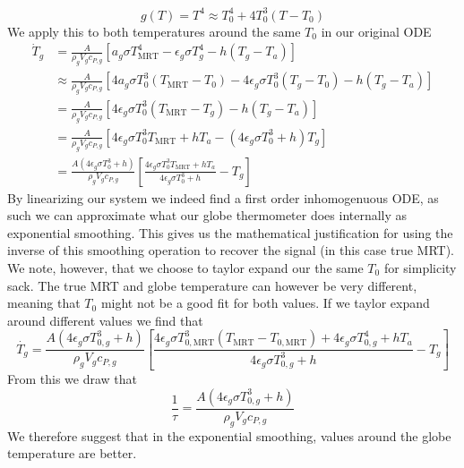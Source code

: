 \documentclass[]{scrartcl}
\begin{document}
$$
g(T) = T^4 \approx T_0^4 + 4T_0^3(T-T_0)
$$
We apply this to both temperatures around the same $T_0$ in our original ODE
\begin{equation}
\begin{split}
	\dot{T}_g &= \frac{A}{\rho_gV_gc_{P,g}}\left[a_g\sigma T^4_{\text{MRT}} - \epsilon_g\sigma T^4_g - h\left(T_g - T_a\right)\right]
	\\
	&\approx\frac{A}{\rho_gV_gc_{P,g}}\left[4a_g\sigma T_0^3(T_{\text{MRT}} - T_0) - 4\epsilon_g\sigma T_0^3(T_g - T_0) - h\left(T_g - T_a\right)\right]
	\\
	&=\frac{A}{\rho_gV_gc_{P,g}}\left[4\epsilon_g\sigma T_0^3(T_{\text{MRT}} - T_g) - h\left(T_g - T_a\right)\right]
	\\
	&=\frac{A}{\rho_gV_gc_{P,g}}\left[4\epsilon_g\sigma T_0^3T_{\text{MRT}}+hT_a-(4\epsilon_g\sigma T_0^3 + h)T_g\right]
	\\
	&=\frac{A(4\epsilon_g\sigma T_0^3 + h)}{\rho_gV_gc_{P,g}}\left[\frac{4\epsilon_g\sigma T_0^3T_{\text{MRT}}+hT_a}{4\epsilon_g\sigma T_0^3 + h}-T_g\right]
\end{split}
\end{equation}
By linearizing our system we indeed find a first order inhomogenuous ODE, as such we can approximate what our globe thermometer does internally as exponential smoothing. This gives us the mathematical justification for using the inverse of this smoothing operation to recover the signal (in this case true MRT). We note, however, that we choose to taylor expand our the same $T_0$ for simplicity sack. The true MRT and globe temperature can however be very different, meaning that $T_0$ might not be a good fit for both values. If we taylor expand around different values we find that
$$
\dot{T_g} = \frac{A(4\epsilon_g\sigma T_{0,g}^3 + h)}{\rho_gV_gc_{P,g}}\left[\frac{4\epsilon_g\sigma T_{0,\text{MRT}}^3 (T_{\text{MRT}} -T_{0,\text{MRT}}) + 4\epsilon_g\sigma T_{0,g}^4 + hT_a}{4\epsilon_g\sigma T_{0,g}^3 + h}-T_g\right]
$$
From this we draw that 
$$
\frac{1}{\tau} = \frac{A(4\epsilon_g\sigma T_{0,g}^3 + h)}{\rho_gV_gc_{P,g}}
$$
We therefore suggest that in the exponential smoothing, values around the globe temperature are better.
\end{document}
